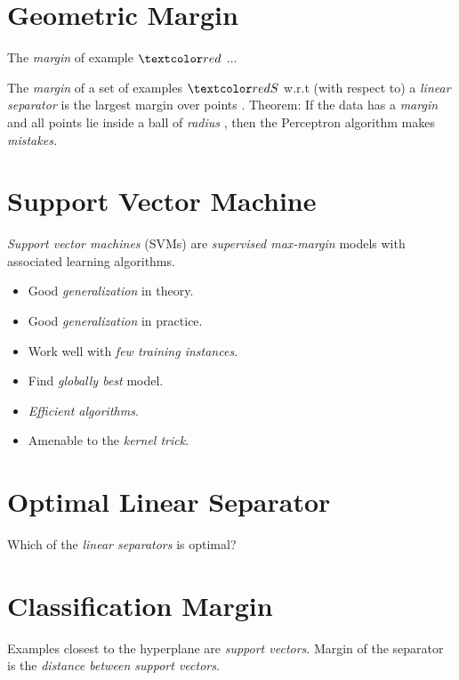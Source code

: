 \documentclass[
	number={2},
	title={Learning Linear Separators{,} SVMs and Kernels}
]{cs584notes}
\begin{document}
\section{Geometric Margin}\label{sec:geometric-margin}
The \emph{margin} of example $\data{}$ $\dots$

The \emph{margin} \data{$\gamma$} of a set of examples $\data{S}$ w.r.t (with respect to)  a \emph{linear separator}  is the largest margin over points .
Theorem: If the data has a \emph{margin} \data{$\gamma$} and all points lie inside a ball of \emph{radius} , then the Perceptron algorithm makes  \emph{mistakes.}

\section{Support Vector Machine}\label{sec:svm}
\emph{Support vector machines} (SVMs) are \emph{supervised max-margin} models with associated learning algorithms.
\begin{itemize}
	\item Good \emph{generalization} in theory.
	\item Good \emph{generalization} in practice.
	\item Work well with \emph{few training instances}.
	\item Find \emph{globally best} model.
	\item \emph{Efficient algorithms}.
	\item Amenable to the \emph{kernel trick}.
\end{itemize}

\section{Optimal Linear Separator}\label{sec:optimal-linear-separator}
Which of the \emph{linear separators} is optimal?

\section{Classification Margin}\label{sec:classification-margin}
Examples closest to the hyperplane are \emph{support vectors}.
Margin \data{$\rho$} of the separator is the \emph{distance between support vectors}.
\end{document}
